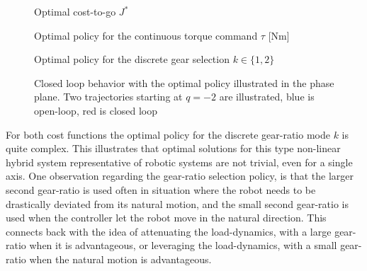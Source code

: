 \begin{figure}[p]
        \centering
        \caption{Optimal cost-to-go $J^*$}\label{fig:J}
\end{figure}

\begin{figure}[p]
        \centering
        \caption{Optimal policy for the continuous torque command $\tau$ [Nm]}\label{fig:u0}
\end{figure}

\begin{figure}[p]
        \centering
        \caption{Optimal policy for the discrete gear selection $k \in \{1,2\}$}\label{fig:u1}
\end{figure}

\begin{figure}[p]
        \centering
        \caption[Closed loop behavior in the phase plane]{Closed loop behavior with the optimal policy illustrated in the phase plane. Two trajectories starting at $q=-2$ are illustrated, blue is open-loop, red is closed loop}\label{fig:phase_plane}
\end{figure}

For both cost functions the optimal policy for the discrete gear-ratio mode $k$ is quite complex. This illustrates that optimal solutions for this type non-linear hybrid system representative of robotic systems are not trivial, even for a single axis. One observation regarding the gear-ratio selection policy, is that the larger second gear-ratio is used often in situation where the robot needs to be drastically deviated from its natural motion, and the small second gear-ratio is used when the controller let the robot move in the natural direction. This connects back with the idea of attenuating the load-dynamics, with a large gear-ratio when it is advantageous, or leveraging the load-dynamics, with a small gear-ratio when the natural motion is advantageous. 




